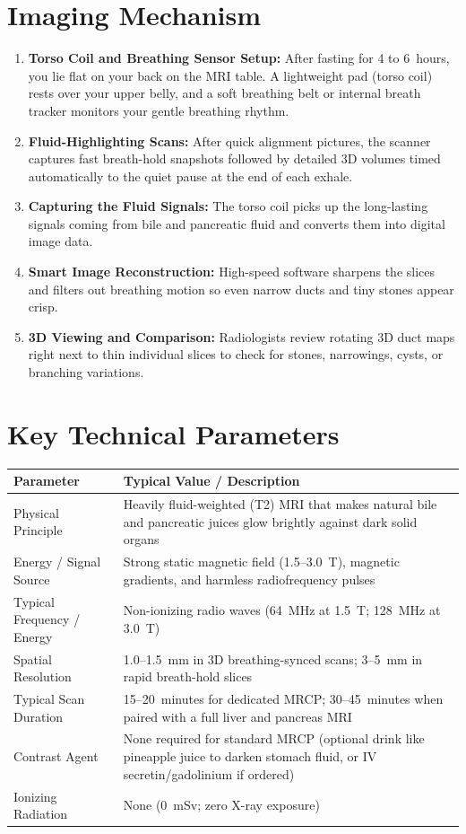 \section{Imaging Mechanism}
\begin{enumerate}
\item \textbf{Torso Coil and Breathing Sensor Setup:} After fasting for 4 to 6~hours, you lie flat on your back on the MRI table. A lightweight pad (torso coil) rests over your upper belly, and a soft breathing belt or internal breath tracker monitors your gentle breathing rhythm.
\item \textbf{Fluid-Highlighting Scans:} After quick alignment pictures, the scanner captures fast breath-hold snapshots followed by detailed 3D volumes timed automatically to the quiet pause at the end of each exhale.
\item \textbf{Capturing the Fluid Signals:} The torso coil picks up the long-lasting signals coming from bile and pancreatic fluid and converts them into digital image data.
\item \textbf{Smart Image Reconstruction:} High-speed software sharpens the slices and filters out breathing motion so even narrow ducts and tiny stones appear crisp.
\item \textbf{3D Viewing and Comparison:} Radiologists review rotating 3D duct maps right next to thin individual slices to check for stones, narrowings, cysts, or branching variations.
\end{enumerate}

\section{Key Technical Parameters}
\noindent
\begin{tabularx}{\textwidth}{@{}l X@{}}
\toprule
\textbf{Parameter} & \textbf{Typical Value / Description} \\
\midrule
Physical Principle & Heavily fluid-weighted (T2) MRI that makes natural bile and pancreatic juices glow brightly against dark solid organs \\
Energy / Signal Source & Strong static magnetic field (1.5--3.0~T), magnetic gradients, and harmless radiofrequency pulses \\
Typical Frequency / Energy & Non-ionizing radio waves (64~MHz at 1.5~T; 128~MHz at 3.0~T) \\
Spatial Resolution & 1.0--1.5~mm in 3D breathing-synced scans; 3--5~mm in rapid breath-hold slices \\
Typical Scan Duration & 15--20~minutes for dedicated MRCP; 30--45~minutes when paired with a full liver and pancreas MRI \\
Contrast Agent & None required for standard MRCP (optional drink like pineapple juice to darken stomach fluid, or IV secretin/gadolinium if ordered) \\
Ionizing Radiation & None (0~mSv; zero X-ray exposure) \\
\bottomrule
\end{tabularx}

